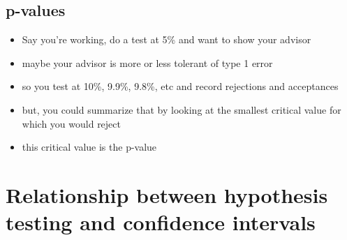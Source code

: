 \subsection{p-values}

\begin{itemize}
\item Say you're working, do a test at 5\% and want to show your advisor
\item maybe your advisor is more or less tolerant of type 1 error
\item so you test at 10\%, 9.9\%, 9.8\%, etc and record rejections and
  acceptances
\item but, you could summarize that by looking at the smallest
  critical value for which you would reject
\item this critical value is the p-value
\end{itemize}

\section{Relationship between hypothesis testing and confidence
  intervals}

